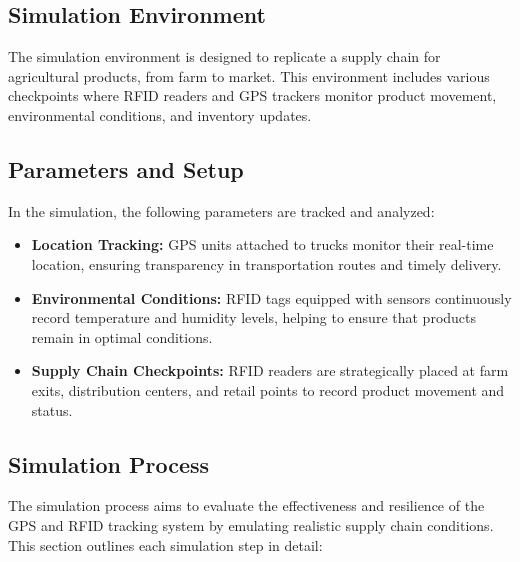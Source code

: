 \documentclass[conference]{IEEEtran}
\begin{document}
\subsection{Simulation Environment}
The simulation environment is designed to replicate a supply chain for agricultural products, from farm to market. This environment includes various checkpoints where RFID readers and GPS trackers monitor product movement, environmental conditions, and inventory updates.

\subsection{Parameters and Setup}
In the simulation, the following parameters are tracked and analyzed:
\begin{itemize}
    \item \textbf{Location Tracking:} GPS units attached to trucks monitor their real-time location, ensuring transparency in transportation routes and timely delivery.
    \item \textbf{Environmental Conditions:} RFID tags equipped with sensors continuously record temperature and humidity levels, helping to ensure that products remain in optimal conditions.
    \item \textbf{Supply Chain Checkpoints:} RFID readers are strategically placed at farm exits, distribution centers, and retail points to record product movement and status.
\end{itemize}

\subsection{Simulation Process}

The simulation process aims to evaluate the effectiveness and resilience of the GPS and RFID tracking system by emulating realistic supply chain conditions. This section outlines each simulation step in detail:\par
\end{document}
